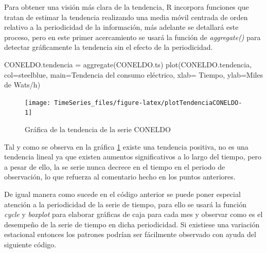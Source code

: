 \documentclass[
  spanish,
]{book}
\newenvironment{Shaded}{\begin{snugshade}}{\end{snugshade}}
\newcommand{\AttributeTok}[1]{\textcolor[rgb]{0.77,0.63,0.00}{#1}}
\newcommand{\FunctionTok}[1]{\textcolor[rgb]{0.00,0.00,0.00}{#1}}
\newcommand{\NormalTok}[1]{#1}
\newcommand{\OtherTok}[1]{\textcolor[rgb]{0.56,0.35,0.01}{#1}}
\newcommand{\StringTok}[1]{\textcolor[rgb]{0.31,0.60,0.02}{#1}}
\theoremstyle{remark}
\begin{document}
Para obtener una visión más clara de la tendencia, R incorpora funciones que tratan de estimar la tendencia realizando una media móvil centrada de orden relativo a la periodicidad de la información, más adelante se detallará este proceso, pero en este primer acercamiento se usará la función de \emph{aggregate()} para detectar gráficamente la tendencia sin el efecto de la periodicidad.

\begin{Shaded}
\begin{Highlighting}[]
\NormalTok{CONELDO.tendencia }\OtherTok{=} \FunctionTok{aggregate}\NormalTok{(CONELDO.ts)}
\FunctionTok{plot}\NormalTok{(CONELDO.tendencia, }\AttributeTok{col=}\StringTok{\textquotesingle{}steelblue\textquotesingle{}}\NormalTok{, }
    \AttributeTok{main=}\StringTok{\textquotesingle{}Tendencia del consumo eléctrico\textquotesingle{}}\NormalTok{,}
    \AttributeTok{xlab=} \StringTok{\textquotesingle{}Tiempo\textquotesingle{}}\NormalTok{,}
    \AttributeTok{ylab=}\StringTok{\textquotesingle{}Miles de Wats/h\textquotesingle{}}\NormalTok{)}
\end{Highlighting}
\end{Shaded}

\begin{figure}

{\centering \texttt{[image: TimeSeries\_files/figure-latex/plotTendenciaCONELDO-1]} 

}

\caption{Gráfica de la tendencia de la serie CONELDO}\label{fig:plotTendenciaCONELDO}
\end{figure}

Tal y como se observa en la gráfica \ref{fig:plotTendenciaCONELDO} existe una tendencia positiva, no es una tendencia lineal ya que existen aumentos significativos a lo largo del tiempo, pero a pesar de ello, la se serie nunca decrece en el tiempo en el periodo de observación, lo que refuerza al comentario hecho en los puntos anteriores.

De igual manera como sucede en el código anterior se puede poner especial atención a la periodicidad de la serie de tiempo, para ello se usará la función \emph{cycle} y \emph{boxplot} para elaborar gráficas de caja para cada mes y observar como es el desempeño de la serie de tiempo en dicha periodicidad. Si existiese una variación estacional entonces los patrones podrían ser fácilmente observado con ayuda del siguiente código.
\end{document}
